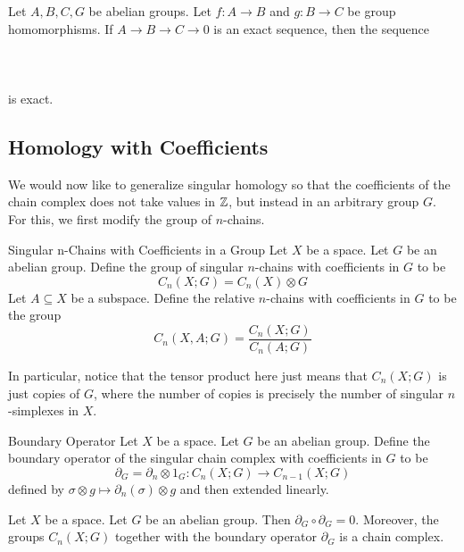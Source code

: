 \documentclass[a4paper]{article}
\begin{document}
\begin{prp}{}{} Let $A,B,C,G$ be abelian groups. Let $f:A\to B$ and $g:B\to C$ be group homomorphisms. If $A\to B\to C\to 0$ is an exact sequence, then the sequence \\~\\
 \\~\\
is exact. 
\end{prp}

\subsection{Homology with Coefficients}
We would now like to generalize singular homology so that the coefficients of the chain complex does not take values in $\mathbb{Z}$, but instead in an arbitrary group $G$. For this, we first modify the group of $n$-chains. 

\begin{defn}{Singular n-Chains with Coefficients in a Group}{} Let $X$ be a space. Let $G$ be an abelian group. Define the group of singular $n$-chains with coefficients in $G$ to be $$C_n(X;G)=C_n(X)\otimes G$$ Let $A\subseteq X$ be a subspace. Define the relative $n$-chains with coefficients in $G$ to be the group $$C_n(X,A;G)=\frac{C_n(X;G)}{C_n(A;G)}$$
\end{defn}

In particular, notice that the tensor product here just means that $C_n(X;G)$ is just copies of $G$, where the number of copies is precisely the number of singular $n$-simplexes in $X$. 

\begin{defn}{Boundary Operator}{} Let $X$ be a space. Let $G$ be an abelian group. Define the boundary operator of the singular chain complex with coefficients in $G$ to be $$\partial_G=\partial_n\otimes 1_G:C_n(X;G)\to C_{n-1}(X;G)$$ defined by $\sigma\otimes g\mapsto\partial_n(\sigma)\otimes g$ and then extended linearly. 
\end{defn}

\begin{lmm}{}{} Let $X$ be a space. Let $G$ be an abelian group. Then $\partial_G\circ\partial_G=0$. Moreover, the groups $C_n(X;G)$ together with the boundary operator $\partial_G$ is a chain complex. 
\end{lmm}
\end{document}
